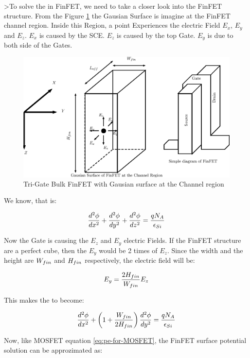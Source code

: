 \documentclass[a4paper]{article}
\begin{document}
>To solve the \PE in FinFET, we need to take a closer look into the FinFET structure. From the Figure \ref{fig:FinFET-E-Field} the Gausian Surface is imagine at the FinFET channel region. Inside this Region, a point Experiences the electric Field $E_x$, $E_y$ and $E_z$. $E_x$ is caused by the SCE. $E_z$ is caused by the top Gate. $E_y$ is due to both side of the Gates.

\begin{figure}[!h]
  \includegraphics[width=\linewidth]{./FinFET-E-Field.eps}
  \caption{Tri-Gate Bulk FinFET with Gausian surface at the Channel region}
  \label{fig:FinFET-E-Field}
\end{figure}

We know, that \PE is:

\begin{equation}
  \frac {d^2\phi} {dx^2} + \frac {d^2\phi} {dy^2} + \frac {d^2\phi} {dz^2} = \frac{qN_A} {\epsilon_{Si}}
\end{equation}

Now the Gate is causing the $E_z$ and $E_y$ electric Fields. If the FinFET structure are a perfect cube, then the $E_y$ would be 2 times of $E_z$. Since the width and the height are $W_{fin}$ and $H_{fin}$ respectively, the electric field will be:

\begin{align*}
  E_y = \frac{2H_{fin}}{W_{fin}} E_z
\end{align*}

This makes the \PE to become:

\begin{equation}
  \label{eq:pe-finFET}
  \frac {d^2\phi} {dx^2} + \left( 1 + \frac{W_{fin}}{2 H_{fin}} \right) \frac {d^2\phi} {dy^2} = \frac{qN_A} {\epsilon_{Si}}
\end{equation}

Now, like MOSFET equation \ref{eq:pe-for-MOSFET}, the FinFET surface potential solution can be approzimated as:
\end{document}
